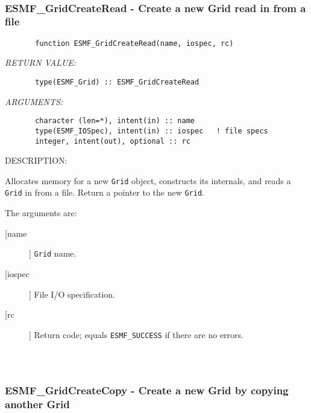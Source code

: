 {
\begin{verbatim} \end{verbatim}
 
 
\mbox{}\hrulefill\ 
 
\subsubsection{ESMF\_GridCreateRead - Create a new Grid read in from a file}


\begin{verbatim}       function ESMF_GridCreateRead(name, iospec, rc)\end{verbatim}{\em RETURN VALUE:}
\begin{verbatim}       type(ESMF_Grid) :: ESMF_GridCreateRead\end{verbatim}{\em ARGUMENTS:}
\begin{verbatim}       character (len=*), intent(in) :: name
       type(ESMF_IOSpec), intent(in) :: iospec   ! file specs
       integer, intent(out), optional :: rc               \end{verbatim}
{\sf DESCRIPTION:\\ }


       Allocates memory for a new {\tt Grid} object, constructs its
       internals, and reads a {\tt Grid} in from a file.  Return a pointer to
       the new {\tt Grid}.
  
       The arguments are:
       \begin{description}
       \item[[name]] 
            {\tt Grid} name.
       \item[[iospec]] 
            File I/O specification.
       \item[[rc]] 
            Return code; equals {\tt ESMF\_SUCCESS} if there are no errors.
     \end{description}
  
\begin{verbatim} \end{verbatim}
 
 
\mbox{}\hrulefill\ 
 
\subsubsection{ESMF\_GridCreateCopy - Create a new Grid by copying another Grid}


}
